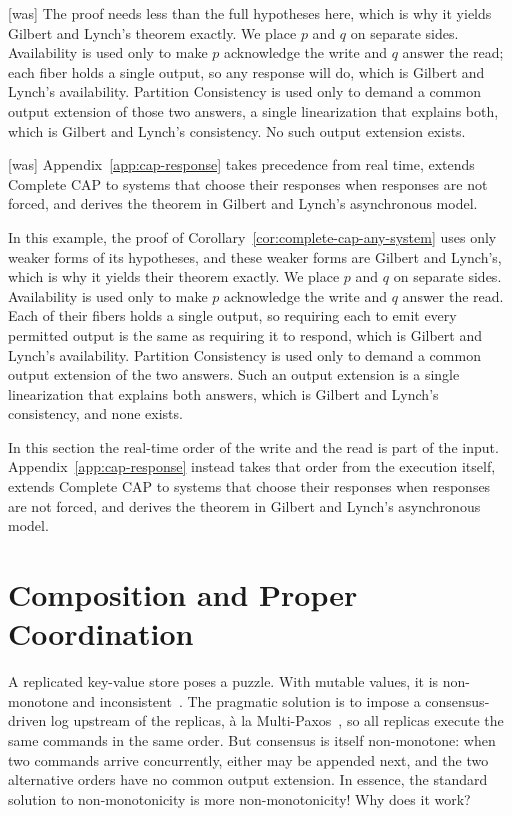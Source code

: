 \documentclass[sigconf]{cidr-2027}
\theoremstyle{remark}
\newcommand{\outnoun}{output extension\xspace}%
\begin{document}
{\footnotesize\color{black!50}\noindent\textsf{[was]} The proof needs less than the full hypotheses here, which
is why it yields Gilbert and Lynch's theorem exactly.  We place $p$ and $q$ on
separate sides.  Availability is used only to make $p$ acknowledge the
write and $q$ answer the read; each fiber holds a single output, so any
response will do, which is Gilbert and Lynch's availability.  Partition
Consistency is used only to demand a common \outnoun of those two answers, a
single linearization that explains both, which is Gilbert and Lynch's
consistency.  No such \outnoun exists.\par}



{\footnotesize\color{black!50}\noindent\textsf{[was]} Appendix~\ref{app:cap-response} takes precedence from real time, extends
Complete CAP to systems that choose their responses when responses are not
forced, and derives
the theorem in Gilbert and Lynch's asynchronous model.\par}

\color{blue!70!black}In this example, the proof of Corollary~\ref{cor:complete-cap-any-system}
uses only weaker forms of its hypotheses, and these weaker forms are Gilbert
and Lynch's, which is why it yields their theorem exactly.  We place $p$ and
$q$ on separate sides.  Availability is used only to make $p$ acknowledge the
write and $q$ answer the read.  Each of their fibers holds a single output, so
requiring each to emit every permitted output is the same as requiring it to
respond, which is Gilbert and Lynch's availability.  Partition Consistency is
used only to demand a common \outnoun of the two answers.  Such an \outnoun is
a single linearization that explains both answers, which is Gilbert and Lynch's
consistency, and none exists.\color{black}

\color{blue!70!black}In this section the real-time order of the write and the read is part of the
input.  Appendix~\ref{app:cap-response} instead takes that order from the
execution itself, extends Complete CAP to systems that choose their responses
when responses are not forced, and derives the theorem in Gilbert and Lynch's
asynchronous model.\color{black}


\section{Composition and Proper Coordination}
\label{sec:composition}

A replicated key-value store poses a puzzle.  With mutable values, it is
non-monotone and inconsistent~\cite{alvaro2011bloom}. The pragmatic solution is
to impose a consensus-driven log upstream of the replicas, \`a la
Multi-Paxos~\cite{lamport2001paxos}, so all replicas execute the same commands
in the same order. But consensus is itself non-monotone: when two commands
arrive concurrently, either may be appended next, and the two alternative orders
have no common \outnoun.  In essence, the standard solution to non-monotonicity
is more non-monotonicity! Why does it work?
\end{document}
